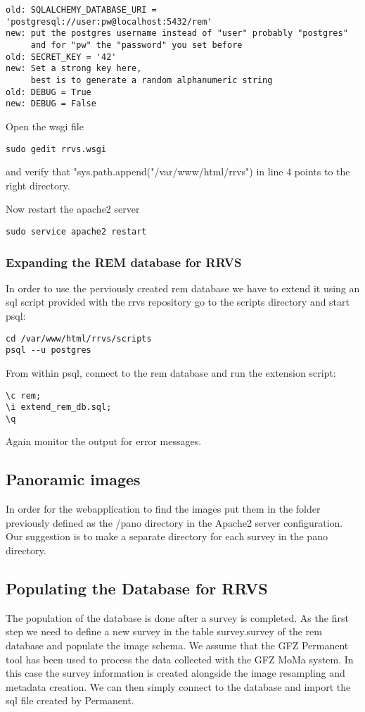 \documentclass{article}
\begin{document}
\begin{verbatim}
old: SQLALCHEMY_DATABASE_URI = 'postgresql://user:pw@localhost:5432/rem'
new: put the postgres username instead of "user" probably "postgres" 
     and for "pw" the "password" you set before
old: SECRET_KEY = '42'
new: Set a strong key here, 
     best is to generate a random alphanumeric string
old: DEBUG = True
new: DEBUG = False

\end{verbatim}

Open the wsgi file
\begin{verbatim}
sudo gedit rrvs.wsgi
\end{verbatim}
 
and verify that "sys.path.append("/var/www/html/rrvs") in line 4 points to the right directory.

Now restart the apache2 server 
\begin{verbatim}
sudo service apache2 restart
\end{verbatim}

\subsubsection{Expanding the REM database for RRVS}
In order to use the perviously created rem database we have to extend
it using an sql script provided with the rrvs repository
go to the scripts directory and start psql:
\begin{verbatim}
cd /var/www/html/rrvs/scripts
psql --u postgres
\end{verbatim}
From within psql, connect to the rem database and run the extension
script:
\begin{verbatim}
\c rem;
\i extend_rem_db.sql;
\q
\end{verbatim}
Again monitor the output for error messages.

\subsection{Panoramic images}
In order for the webapplication to find the images put them
in the folder previously defined as the /pano directory in the 
Apache2 server configuration. Our suggestion is to make a 
separate directory for each survey in the pano directory. 

\subsection{Populating the Database for RRVS}
The population of the database is done after a survey is completed.
As the first step we need to define a new survey in the table 
survey.survey of the rem database and populate the image schema. 
We assume that the GFZ Permanent tool has been used to process the 
data collected with the GFZ MoMa system. In this case the survey 
information is created alongside the image resampling and metadata 
creation. We can then simply connect to the database and import
the sql file created by Permanent.
\end{document}
